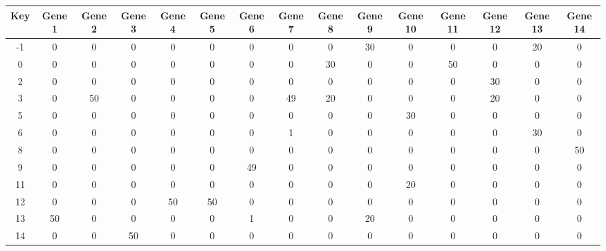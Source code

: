 \begin{tabular}{|c|c|c|c|c|c|c|c|c|c|c|c|c|c|c|}
\hline
Key & Gene 1 & Gene 2 & Gene 3 & Gene 4 & Gene 5 & Gene 6 & Gene 7 & Gene 8 & Gene 9 & Gene 10 & Gene 11 & Gene 12 & Gene 13 & Gene 14 \\
\hline
-1 & 0 & 0 & 0 & 0 & 0 & 0 & 0 & 0 & 30 & 0 & 0 & 0 & 20 & 0 \\
0 & 0 & 0 & 0 & 0 & 0 & 0 & 0 & 30 & 0 & 0 & 50 & 0 & 0 & 0 \\
2 & 0 & 0 & 0 & 0 & 0 & 0 & 0 & 0 & 0 & 0 & 0 & 30 & 0 & 0 \\
3 & 0 & 50 & 0 & 0 & 0 & 0 & 49 & 20 & 0 & 0 & 0 & 20 & 0 & 0 \\
5 & 0 & 0 & 0 & 0 & 0 & 0 & 0 & 0 & 0 & 30 & 0 & 0 & 0 & 0 \\
6 & 0 & 0 & 0 & 0 & 0 & 0 & 1 & 0 & 0 & 0 & 0 & 0 & 30 & 0 \\
8 & 0 & 0 & 0 & 0 & 0 & 0 & 0 & 0 & 0 & 0 & 0 & 0 & 0 & 50 \\
9 & 0 & 0 & 0 & 0 & 0 & 49 & 0 & 0 & 0 & 0 & 0 & 0 & 0 & 0 \\
11 & 0 & 0 & 0 & 0 & 0 & 0 & 0 & 0 & 0 & 20 & 0 & 0 & 0 & 0 \\
12 & 0 & 0 & 0 & 50 & 50 & 0 & 0 & 0 & 0 & 0 & 0 & 0 & 0 & 0 \\
13 & 50 & 0 & 0 & 0 & 0 & 1 & 0 & 0 & 20 & 0 & 0 & 0 & 0 & 0 \\
14 & 0 & 0 & 50 & 0 & 0 & 0 & 0 & 0 & 0 & 0 & 0 & 0 & 0 & 0 \\
\hline
\end{tabular}